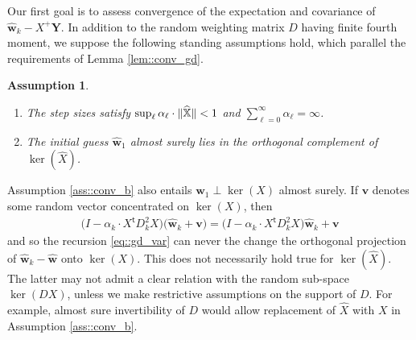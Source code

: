 \documentclass{article}
\newcommand*{\bbX}{\mathbb{X}}
\newcommand*{\bfY}{\mathbf{Y}}
\newcommand*{\bfv}{\mathbf{v}}
\newcommand*{\bfw}{\mathbf{w}}
\newcommand*{\pinv}{^{+}}
\newcommand*{\tran}{^{\mathsf{t}}}
\DeclarePairedDelimiter{\norm}{\lVert}{\rVert}
\newcommand{\whweight}{\widehat{\bfw}}
\newcommand{\whX}{\widehat{X}}
\newcommand{\whbbX}{\widehat{\bbX}}
\newtheorem{assumption}[lemma]{Assumption}
\begin{document}
Our first goal is to assess convergence of the expectation and covariance of
$\whweight_k - X\pinv \bfY$. In addition to the random weighting matrix $D$
having finite fourth moment, we suppose the following standing assumptions hold,
which parallel the requirements of Lemma \ref{lem::conv_gd}.

\begin{assumption}
  \label{ass::conv_iso}
  \begin{enumerate}
    \item The step sizes satisfy $\sup_{\ell} \alpha_\ell \cdot \norm{\whbbX} <
      1$ and $\sum_{\ell = 0}^\infty \alpha_\ell = \infty$. \label{ass::conv_a}
    \item The initial guess $\whweight_1$ almost surely lies in the orthogonal
      complement of $\ker(\whX)$. \label{ass::conv_b}
  \end{enumerate}
\end{assumption}

Assumption \ref{ass::conv_b} also entails $\whweight_1 \perp \ker(X)$ almost
surely. If $\bfv$ denotes some random vector concentrated on $\ker(X)$, then
\begin{align*}
  \big(I - \alpha_k \cdot X\tran D_k^2 X\big) \big(\whweight_k + \bfv\big) =
  \big(I - \alpha_k \cdot X\tran D_k^2 X\big) \whweight_k + \bfv
\end{align*} and so the recursion \eqref{eq::gd_var} can never the change the
orthogonal projection of $\whweight_k - \whweight$ onto $\ker(X)$. This does not
necessarily hold true for $\ker(\whX)$. The latter may not admit a clear
relation with the random sub-space $\ker(D X)$, unless we make restrictive
assumptions on the support of $D$. For example, almost sure invertibility of $D$
would allow replacement of $\whX$ with $X$ in Assumption \ref{ass::conv_b}.
\end{document}
